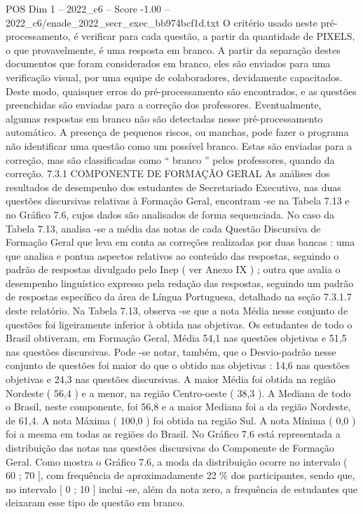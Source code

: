 \begin{textsample}{POS Dim 1 – 2022\_c6 – Score -1.00 – 2022\_c6/enade\_2022\_secr\_exec\_bb974bcf1d.txt}
O critério usado neste pré-processamento, é verificar para cada questão, a partir da quantidade de PIXELS, o que provavelmente, é uma resposta em branco.
A partir da separação destes documentos que foram considerados em branco, eles são enviados para uma verificação visual, por uma equipe de colaboradores, devidamente capacitados.
Deste modo, quaisquer erros do pré-processamento são encontrados, e as questões preenchidas são enviadas para a correção dos professores.
Eventualmente, algumas respostas em branco não são detectadas nesse pré-processamento automático.
A presença de pequenos riscos, ou manchas, pode fazer o programa não identificar uma questão como um possível branco.
Estas são enviadas para a correção, mas são classificadas como “ branco ” pelos professores, quando da correção. 7.3.1 COMPONENTE DE FORMAÇÃO GERAL As análises dos resultados de desempenho dos estudantes de Secretariado Executivo, nas duas questões discursivas relativas à Formação Geral, encontram -se na Tabela 7.13 e no Gráfico 7.6, cujos dados são analisados de forma sequenciada.
No caso da Tabela 7.13, analisa -se a média das notas de cada Questão Discursiva de Formação Geral que leva em conta as correções realizadas por duas bancas : uma que analisa e pontua aspectos relativos ao conteúdo das respostas, seguindo o padrão de respostas divulgado pelo Inep ( ver Anexo IX ) ; outra que avalia o desempenho linguístico expresso pela redação das respostas, seguindo um padrão de respostas específico da área de Língua Portuguesa, detalhado na seção 7.3.1.7 deste relatório.
Na Tabela 7.13, observa -se que a nota Média nesse conjunto de questões foi ligeiramente inferior à obtida nas objetivas.
Os estudantes de todo o Brasil obtiveram, em Formação Geral, Média 54,1 nas questões objetivas e 51,5 nas questões discursivas.
Pode -se notar, também, que o Desvio-padrão nesse conjunto de questões foi maior do que o obtido nas objetivas : 14,6 nas questões objetivas e 24,3 nas questões discursivas.
A maior Média foi obtida na região Nordeste ( 56,4 ) e a menor, na região Centro-oeste ( 38,3 ).
A Mediana de todo o Brasil, neste componente, foi 56,8 e a maior Mediana foi a da região Nordeste, de 61,4.
A nota Máxima ( 100,0 ) foi obtida na região Sul.
A nota Mínima ( 0,0 ) foi a mesma em todas as regiões do Brasil.
No Gráfico 7.6 está representada a distribuição das notas nas questões discursivas do Componente de Formação Geral.
Como mostra o Gráfico 7.6, a moda da distribuição ocorre no intervalo ( 60 ; 70 ], com frequência de aproximadamente 22 \% dos participantes, sendo que, no intervalo [ 0 ; 10 ] inclui -se, além da nota zero, a frequência de estudantes que deixaram esse tipo de questão em branco.

\end{textsample}
